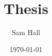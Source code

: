 \documentclass[11pt,a4paper]{report}
\title{Thesis}
\author{Sam Hall}
\date{\today}
\begin{document}
\linenumbers





\end{document}
